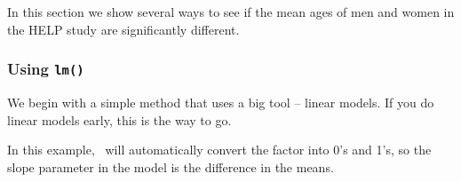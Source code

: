 In this section we show several ways to see if the mean ages of men and women in the HELP study 
are significantly different.



\subsubsection{Using \texttt{lm()}}
\label{sec:lm}
We begin with a simple method that uses a big tool -- linear models.  If you do 
linear models early, this is the way to go.


In this example, \R\ will automatically convert the  factor into
0's and 1's, so the slope parameter in the model is the difference in the means.  
\begin{knitrout}
\end{knitrout}

